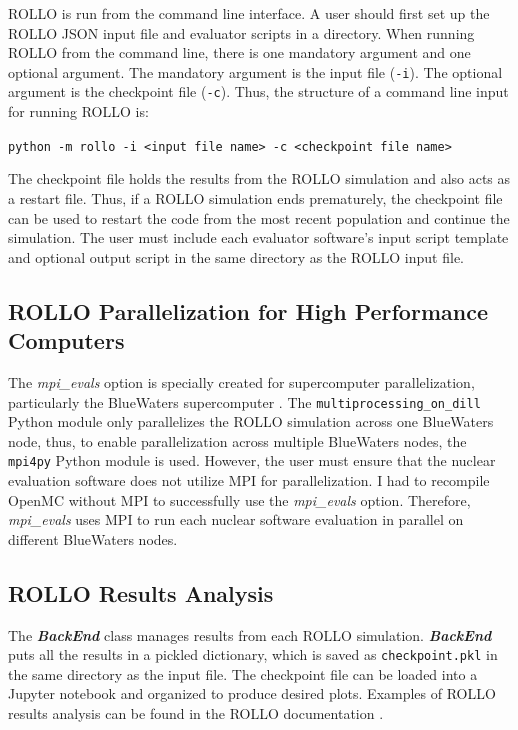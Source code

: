 \gls{ROLLO} is run from the command line interface. 
A user should first set up the \gls{ROLLO} JSON input file and evaluator 
scripts in a directory. 
When running \gls{ROLLO} from the command line, there is one mandatory argument and 
one optional argument. 
The mandatory argument is the input file (\texttt{-i}). 
The optional argument is the checkpoint file (\texttt{-c}).  
Thus, the structure of a command line input for running \gls{ROLLO} is: 

\noindent
\texttt{python -m rollo -i <input file name> -c <checkpoint file name>}

The checkpoint file holds the results from the \gls{ROLLO} simulation and also acts 
as a restart file. 
Thus, if a \gls{ROLLO} simulation ends prematurely, the checkpoint file can be used 
to restart the code from the most recent population and continue the simulation. 
The user must include each evaluator software's input script template 
and optional output script in the same directory as the \gls{ROLLO} input file. 

\subsection{ROLLO Parallelization for High Performance Computers}
\label{sec:rollo_parallel}
The \textit{mpi\_evals} option is specially created for supercomputer 
parallelization, particularly the BlueWaters supercomputer \cite{ncsa_about_2017}.
The \texttt{multiprocessing\_on\_dill} Python module only parallelizes the \gls{ROLLO}
simulation across one BlueWaters node, thus, to enable parallelization across 
multiple BlueWaters nodes, the \texttt{mpi4py} Python module is used. 
However, the user must ensure that the nuclear evaluation software does not 
utilize MPI for parallelization. 
I had to recompile OpenMC without MPI to successfully use the 
\textit{mpi\_evals} option.
Therefore, \textit{mpi\_evals} uses MPI to run each nuclear software evaluation
in parallel on different BlueWaters nodes. 

\subsection{\gls{ROLLO} Results Analysis}
The \textbf{\textit{BackEnd}} class manages results from each \gls{ROLLO} simulation. 
\textbf{\textit{BackEnd}} puts all the results in a pickled dictionary, which 
is saved as \texttt{checkpoint.pkl} in the same directory as the input file. 
The checkpoint file can be loaded into a Jupyter notebook and organized 
to produce desired plots. 
Examples of \gls{ROLLO} results analysis can be found in the \gls{ROLLO} documentation 
\cite{chee_documentation_2021}. 

